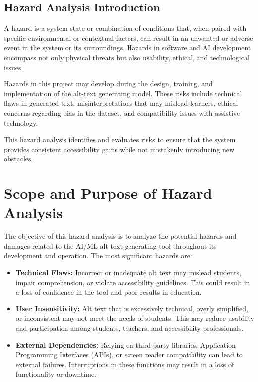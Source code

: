 \documentclass{article}
\begin{document}
\subsection{Hazard Analysis Introduction}
A hazard is a system state or combination of conditions that, when paired with specific environmental or contextual factors, can result in an unwanted or adverse event in the system or its surroundings. Hazards in software and AI development encompass not only physical threats but also usability, ethical, and technological issues.

Hazards in this project may develop during the design, training, and implementation of the alt-text generating model. These risks include technical flaws in generated text, misinterpretations that may mislead learners, ethical concerns regarding bias in the dataset, and compatibility issues with assistive technology.

This hazard analysis identifies and evaluates risks to ensure that the system provides consistent accessibility gains while not mistakenly introducing new obstacles.

\section{Scope and Purpose of Hazard Analysis}
The objective of this hazard analysis is to analyze the potential hazards and damages related to the AI/ML alt-text generating tool throughout its development and operation. The most significant hazards are:

\begin{itemize}
    \item \textbf{Technical Flaws:} Incorrect or inadequate alt text may mislead students, impair comprehension, or violate accessibility guidelines. This could result in a loss of confidence in the tool and poor results in education.
    \item \textbf{User Insensitivity:} Alt text that is excessively technical, overly simplified, or inconsistent may not meet the needs of students. This may reduce usability and participation among students, teachers, and accessibility professionals.
    \item \textbf{External Dependencies:} Relying on third-party libraries, Application Programming Interfaces (APIs), or screen reader compatibility can lead to external failures. Interruptions in these functions may result in a loss of functionality or downtime.
\end{itemize}
\end{document}

